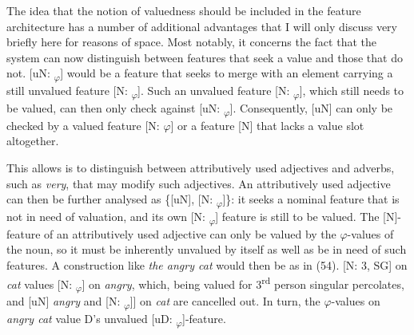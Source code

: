 \documentclass[output=paper
,modfonts
,nonflat]{langsci/langscibook}
\begin{document}
\begin{figure}[!h]
	\begin{exe}
	\end{exe}
\end{figure}
\noindent The idea that the notion of valuedness should be included in the feature architecture has a number of additional advantages that I will only discuss very briefly here for reasons of space. Most notably, it concerns the fact that the system can now distinguish between features that seek a value and those that do not. [uN: \ul{}\textsubscript{$\varphi$}] would be a feature that seeks to merge with an element carrying a still unvalued feature [N: \ul{}\textsubscript{$\varphi$}]. Such an unvalued feature [N: \ul{}\textsubscript{$\varphi$}], which still needs to be valued, can then only check against [uN: \ul{}\textsubscript{$\varphi$}]. Consequently, [uN] can only be checked by a valued feature [N: $\varphi$] or a feature [N] that lacks a value slot altogether. 

This allows is to distinguish between attributively used adjectives and adverbs, such as \textit{very}, that may modify such adjectives. An attributively used adjective can then be further analysed as \{[uN], [N: \ul{}\textsubscript{$\varphi$}]\}: it seeks a nominal feature that is not in need of valuation, and its own [N: \ul{}\textsubscript{$\varphi$}] feature is still to be valued. The [N]-feature of an attributively used adjective can only be valued by the $\varphi$-values of the noun, so it must be inherently unvalued by itself as well as be in need of such features. A construction like \textit{the angry cat} would then be as in (54). [N: 3, SG] on \textit{cat} values [N: \ul{}\textsubscript{$\varphi$}] on \textit{angry}, which, being valued for 3\textsuperscript{rd} person singular percolates, and [uN] \textit{angry} and [N: \ul{}\textsubscript{$\varphi$}]] on \textit{cat} are cancelled out. In turn, the $\varphi$-values on \textit{angry cat} value D’s unvalued [uD: \ul{}\textsubscript{$\varphi$}]-feature.
\end{document}

